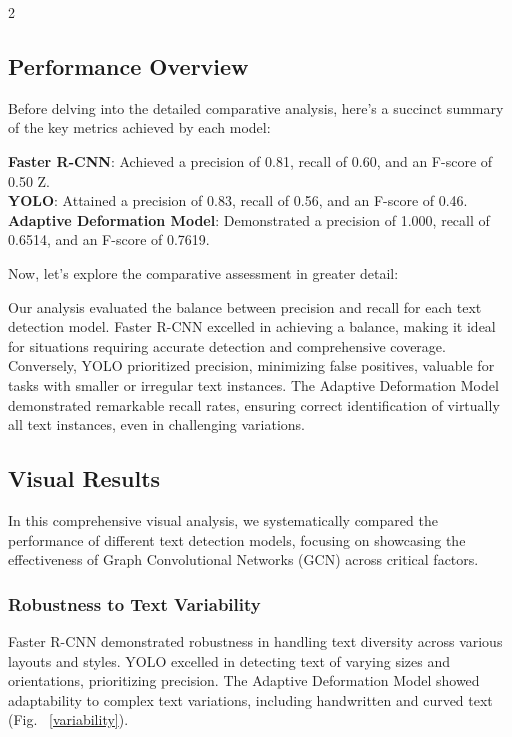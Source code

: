 \documentclass[sn-mathphys,Numbered]{sn-jnl}%
\begin{document}
\begin{multicols}{2}
\subsection{Performance Overview}

Before delving into the detailed comparative analysis, here's a succinct summary of the key metrics achieved by each model:

\textbf{Faster R-CNN}: Achieved a precision of 0.81, recall of 0.60, and an F-score of 0.50
Z. \\
\textbf{YOLO}: Attained a precision of 0.83, recall of 0.56, and an F-score of 0.46. \\
\textbf{Adaptive Deformation Model}: Demonstrated a precision of 1.000, recall of 0.6514, and an F-score of 0.7619.

Now, let's explore the comparative assessment in greater detail:

Our analysis evaluated the balance between precision and recall for each text detection model. Faster R-CNN excelled in achieving a balance, making it ideal for situations requiring accurate detection and comprehensive coverage. Conversely, YOLO prioritized precision, minimizing false positives, valuable for tasks with smaller or irregular text instances. The Adaptive Deformation Model demonstrated remarkable recall rates, ensuring correct identification of virtually all text instances, even in challenging variations.

\subsection{Visual Results}
In this comprehensive visual analysis, we systematically compared the performance of different text detection models, focusing on showcasing the effectiveness of Graph Convolutional Networks (GCN) across critical factors.

\subsubsection*{Robustness to Text Variability} 
Faster R-CNN demonstrated robustness in handling text diversity across various layouts and styles. YOLO excelled in detecting text of varying sizes and orientations, prioritizing precision. The Adaptive Deformation Model showed adaptability to complex text variations, including handwritten and curved text (Fig. ~\ref{variability}).


\end{multicols}
\end{document}
